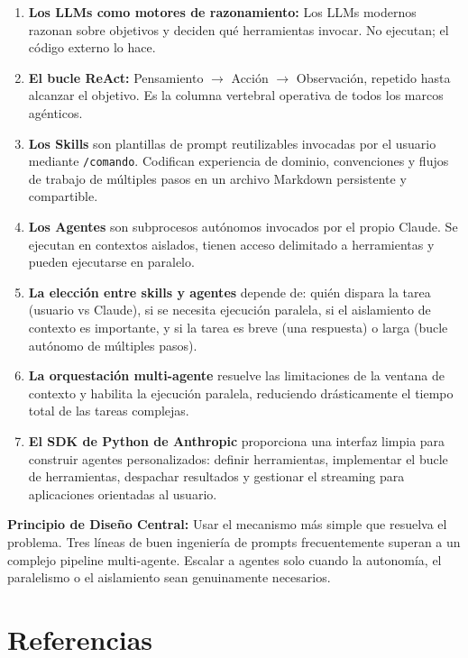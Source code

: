 \documentclass[11pt,letterpaper]{article}
\begin{document}
\begin{enumerate}[leftmargin=*]
    \item \textbf{Los LLMs como motores de razonamiento:} Los LLMs modernos razonan sobre objetivos y deciden qué herramientas invocar. No ejecutan; el código externo lo hace.
    \item \textbf{El bucle ReAct:} Pensamiento $\rightarrow$ Acción $\rightarrow$ Observación, repetido hasta alcanzar el objetivo. Es la columna vertebral operativa de todos los marcos agénticos.
    \item \textbf{Los Skills} son plantillas de prompt reutilizables invocadas por el usuario mediante \texttt{/comando}. Codifican experiencia de dominio, convenciones y flujos de trabajo de múltiples pasos en un archivo Markdown persistente y compartible.
    \item \textbf{Los Agentes} son subprocesos autónomos invocados por el propio Claude. Se ejecutan en contextos aislados, tienen acceso delimitado a herramientas y pueden ejecutarse en paralelo.
    \item \textbf{La elección entre skills y agentes} depende de: quién dispara la tarea (usuario vs Claude), si se necesita ejecución paralela, si el aislamiento de contexto es importante, y si la tarea es breve (una respuesta) o larga (bucle autónomo de múltiples pasos).
    \item \textbf{La orquestación multi-agente} resuelve las limitaciones de la ventana de contexto y habilita la ejecución paralela, reduciendo drásticamente el tiempo total de las tareas complejas.
    \item \textbf{El SDK de Python de Anthropic} proporciona una interfaz limpia para construir agentes personalizados: definir herramientas, implementar el bucle de herramientas, despachar resultados y gestionar el streaming para aplicaciones orientadas al usuario.
\end{enumerate}

\begin{notebox}
\textbf{Principio de Diseño Central:} Usar el mecanismo más simple que resuelva el problema. Tres líneas de buen ingeniería de prompts frecuentemente superan a un complejo pipeline multi-agente. Escalar a agentes solo cuando la autonomía, el paralelismo o el aislamiento sean genuinamente necesarios.
\end{notebox}

\section*{Referencias}
\end{document}
